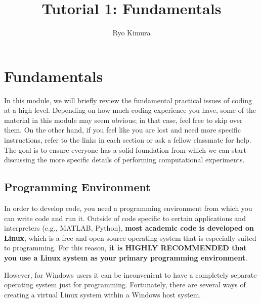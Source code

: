 \documentclass[12pt]{article}
\begin{document}
\title{Tutorial 1: Fundamentals}
\author{Ryo Kimura}
\maketitle

\section{Fundamentals}
In this module, we will briefly review the fundamental practical issues of coding at a high level.
Depending on how much coding experience you have, some of the material in this module may seem obvious; in that case, feel free to skip over them.
On the other hand, if you feel like you are lost and need more specific instructions, refer to the links in each section or ask a fellow classmate for help.
The goal is to ensure everyone has a solid foundation from which we can start discussing the more specific details of performing computational experiments.

\subsection{Programming Environment} \label{sec:progenv}
In order to develop code, you need a programming environment from which you can write code and run it.
Outside of code specific to certain applications and interpreters (e.g., MATLAB, Python), \textbf{most academic code is developed on Linux}, which is a free and open source operating system that is especially suited to programming.
For this reason, \textbf{it is HIGHLY RECOMMENDED that you use a Linux system as your primary programming environment}.

However, for Windows users it can be inconvenient to have a completely separate operating system just for programming.
Fortunately, there are several ways of creating a virtual Linux system within a Windows host system.
\end{document}
